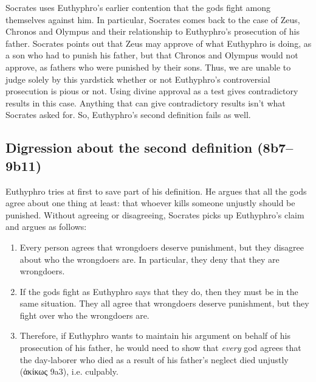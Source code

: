 \documentclass[11pt]{article}
\begin{document}
Socrates uses Euthyphro's earlier contention that the gods fight among
themselves against him.  In particular, Socrates comes back to the case of
Zeus, Chronos and Olympus and their relationship to Euthyphro's prosecution
of his father.  Socrates points out that Zeus may approve of what Euthyphro
is doing, as a son who had to punish his father, but that Chronos and
Olympus would not approve, as fathers who were punished by their sons.
Thus, we are unable to judge solely by this yardstick whether or not
Euthyphro's controversial prosecution is pious or not.  Using divine
approval as a test gives contradictory results in this case.  Anything that
can give contradictory results isn't what Socrates asked for.  So,
Euthyphro's second definition fails as well.


\subsection{Digression about the second definition (8b7--9b11)}

Euthyphro tries at first to save part of his definition.  He argues that
all the gods agree about one thing at least: that whoever kills someone
unjustly should be punished.  Without agreeing or disagreeing, Socrates
picks up Euthyphro's claim and argues as follows:

\begin{enumerate}

    \item Every person agrees that wrongdoers deserve punishment, but they
        disagree about who the wrongdoers are.  In particular, they deny
        that they are wrongdoers.

    \item If the gods fight as Euthyphro says that they do, then they must
        be in the same situation.  They all agree that wrongdoers deserve
        punishment, but they fight over who the wrongdoers are.

    \item Therefore, if Euthyphro wants to maintain his argument on behalf
        of his prosecution of his father, he would need to show that
        \emph{every} god agrees that the day-laborer who died as a result
        of his father's neglect died unjustly ({\g ἀκίκως} 9a3), i.e.
        culpably.

\end{enumerate}
\end{document}

